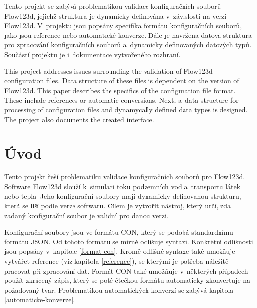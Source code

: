 \documentclass[FM,MP]{tulthesis}
\begin{document}
\renewcommand{\thetable}{\arabic{table}}
\renewcommand{\thefigure}{\arabic{figure}}


\begin{abstractCZ}
	Tento projekt se zabývá problematikou validace konfiguračních souborů Flow123d, jejichž struktura je dynamicky definována v~závislosti na verzi Flow123d. V~projektu jsou popsány specifika formátu konfiguračních souborů, jako jsou reference nebo automatické konverze. Dále je navržena datová struktura pro zpracování konfiguračních souborů a~dynamicky definovaných datových typů. Součástí projektu je i~dokumentace vytvořeného rozhraní.
\end{abstractCZ}
\vspace{2cm}
\begin{abstractEN}
	This project addresses issues surrounding the validation of Flow123d configuration files. Data structure of these files is dependent on the version of Flow123d. This paper describes the specifics of the configuration file format. These include references or automatic conversions. Next, a~data structure for processing of configuration files and dynamycally defined data types is designed. The project also documents the created interface.
\end{abstractEN}

\tableofcontents
\clearpage

\chapter{Úvod}
	Tento projekt řeší problematiku validace konfiguračních souborů pro  Flow123d\cite{bib:flow123d}. Software Flow123d slouží k~simulaci toku podzemních vod a~transportu látek nebo tepla. Jeho konfigurační soubory mají dynamicky definovanou strukturu, která se liší podle verze softwaru. Cílem je vytvořit nástroj, který určí, zda zadaný konfigurační soubor je validní pro danou verzi.

	Konfigurační soubory jsou ve formátu CON, který se podobá standardnímu formátu JSON. Od tohoto formátu se mírně odlišuje syntaxí. Konkrétní odlišnosti jsou popsány v~kapitole \ref{format-con}. Kromě odlišné syntaxe také umožňuje vytvářet reference (viz kapitola \ref{reference}), se kterými je potřeba náležitě pracovat při zpracování dat. Formát CON také umožňuje v~některých případech použít zkrácený zápis, který se poté čtečkou formátu automaticky zkonvertuje na požadovaný tvar. Problematikou automatických konverzí se zabývá kapitola \ref{automaticke-konverze}.
\end{document}

